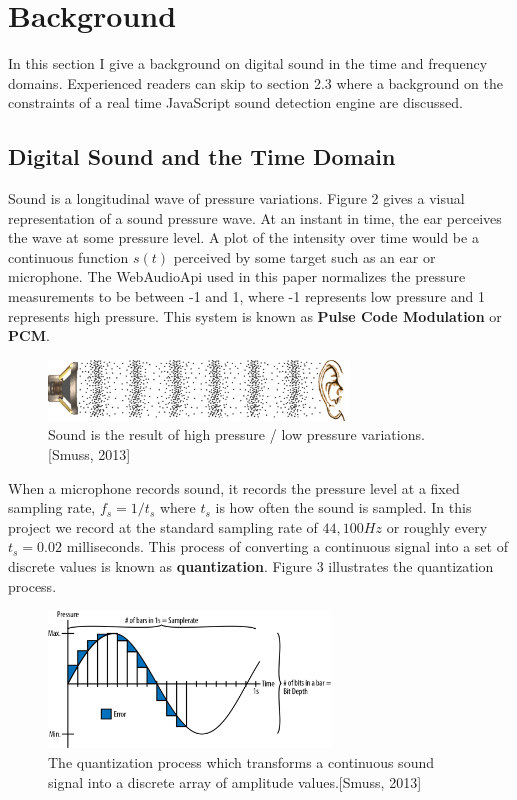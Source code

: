 \documentclass[DIV=calc, paper=a4, fontsize=11pt, twocolumn]{scrartcl}   %
\begin{document}
\section{Background}
In this section I give a background on digital sound in the time and frequency domains. Experienced readers can skip to section 2.3 where a background on the constraints of a real time JavaScript sound detection engine are discussed.
\subsection{Digital Sound and the Time Domain}
Sound is a longitudinal wave of pressure variations. Figure 2 gives a visual representation of a sound pressure wave. At an instant in time, the ear perceives the wave at some pressure level. A plot of the intensity over time would be a continuous function $s(t)$ perceived by some target such as an ear or microphone. The WebAudioApi used in this paper normalizes the pressure measurements to be between -1 and 1, where -1 represents low pressure and 1 represents high pressure. This system is known as \textbf{Pulse Code Modulation} or \textbf{PCM}.

\begin{figure}[h]
\centering
\includegraphics[width=80mm]{figures/pressure_wave.png}
\caption{Sound is the result of high pressure / low pressure variations. [Smuss, 2013]}
\label{overflow}
\end{figure}

\par When a microphone records sound, it records the pressure level at a fixed sampling rate, $ f_s = 1/t_s $ where $t_s$ is how often the sound is sampled. In this project we record at the standard sampling rate of
 $44,100Hz$ or roughly every $t_s =0.02$ milliseconds. This process of converting a continuous signal into a set of discrete values is known as \textbf{quantization}. Figure 3 illustrates the quantization process.

 \begin{figure}[h]
\centering
\includegraphics[width=75mm]{figures/quantization.png}
\caption{The quantization process which transforms a continuous sound signal into a discrete array of amplitude values.[Smuss, 2013]}
\label{overflow}
\end{figure}
\end{document}
